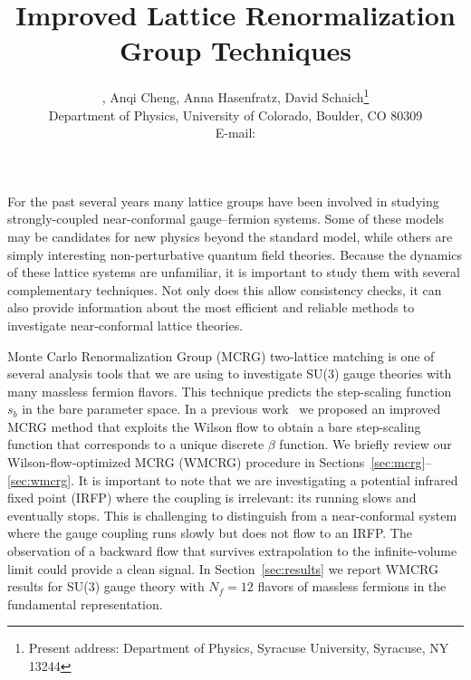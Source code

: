 \documentclass{PoS}
\title{Improved Lattice Renormalization Group Techniques}
\author{\speaker{Gregory Petropoulos}, Anqi Cheng, Anna Hasenfratz, David Schaich\footnote{Present address: Department of Physics, Syracuse University, Syracuse, NY 13244} \\
        Department of Physics, University of Colorado, Boulder, CO 80309 \\
        E-mail: \email{gregory.petropoulos@colorado.edu}}
\newcommand{\be}{\ensuremath{\beta} }
\newcommand{\secref}[1]{Section~\ref{#1}}
\begin{document}
For the past several years many lattice groups have been involved in studying strongly-coupled near-conformal gauge--fermion systems.
Some of these models may be candidates for new physics beyond the standard model, while others are simply interesting non-perturbative quantum field theories.
Because the dynamics of these lattice systems are unfamiliar, it is important to study them with several complementary techniques.
Not only does this allow consistency checks, it can also provide information about the most efficient and reliable methods to investigate near-conformal lattice theories.

Monte Carlo Renormalization Group (MCRG) two-lattice matching is one of several analysis tools that we are using to investigate SU(3) gauge theories with many massless fermion flavors.
This technique predicts the step-scaling function $s_b$ in the bare parameter space.
In a previous work~\cite{Petropoulos:2012mg} we proposed an improved MCRG method that exploits the Wilson flow to obtain a bare step-scaling function that corresponds to a unique discrete \be function.
We briefly review our Wilson-flow-optimized MCRG (WMCRG) procedure in Sections~\ref{sec:mcrg}--\ref{sec:wmcrg}.
It is important to note that we are investigating a potential infrared fixed point (IRFP) where the coupling is irrelevant: its running slows and eventually stops.
This is challenging to distinguish from a near-conformal system where the gauge coupling runs slowly but does not flow to an IRFP.
The observation of a backward flow that survives extrapolation to the infinite-volume limit could provide a clean signal.
In \secref{sec:results} we report WMCRG results for SU(3) gauge theory with $N_f = 12$ flavors of massless fermions in the fundamental representation.
\end{document}
